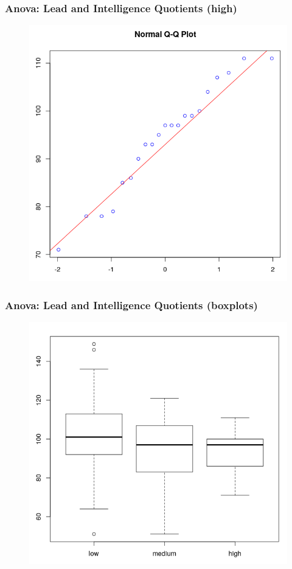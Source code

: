 \documentclass[xcolor=dvipsnames]{beamer} \usepackage{teachbeamer}
\begin{document}
\begin{frame}
  \frametitle{Anova: Lead and Intelligence Quotients (high)}
  \begin{figure}[h]
    \includegraphics[scale=0.35]{./diagrams/lead_h.png}
  \end{figure}
\end{frame}

\begin{frame}
  \frametitle{Anova: Lead and Intelligence Quotients (boxplots)}
\begin{figure}[h]
  \includegraphics[scale=0.35]{./diagrams/lead_bp.png}
\end{figure}
\end{frame}
\end{document}
